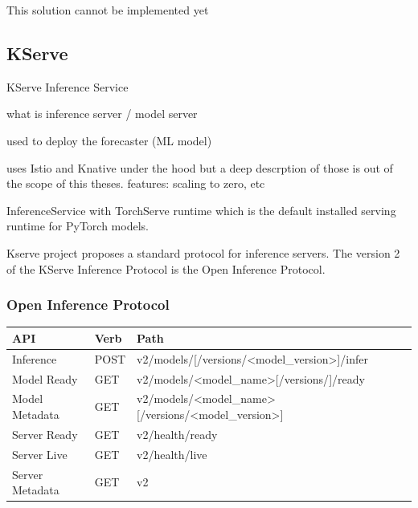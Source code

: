 This solution cannot be implemented yet




\subsection{KServe}


KServe Inference Service


what is
inference server / model server


used to deploy the forecaster (ML model)


uses Istio and Knative under the hood
but a deep descrption of those is out of the scope of this theses.
features: scaling to zero, etc


InferenceService with TorchServe runtime which is the default installed serving runtime for PyTorch models.

Kserve project proposes a standard protocol for inference servers.
The version 2 of the KServe Inference Protocol is the Open Inference Protocol.



\subsubsection{Open Inference Protocol}


\begin{table}[h!]
\centering
\begin{tabular}{|l|l|l|}
\hline
\textbf{API}    & \textbf{Verb} & \textbf{Path}                                                                                         \\ \hline
Inference       & POST          & v2/models/{[}/versions/\textless{}model\_version\textgreater{}{]}/infer                               \\ \hline
Model Ready     & GET           & v2/models/\textless{}model\_name\textgreater{}{[}/versions/{]}/ready                                  \\ \hline
Model Metadata  & GET           & v2/models/\textless{}model\_name\textgreater{}{[}/versions/\textless{}model\_version\textgreater{}{]} \\ \hline
Server Ready    & GET           & v2/health/ready                                                                                       \\ \hline
Server Live     & GET           & v2/health/live                                                                                        \\ \hline
Server Metadata & GET           & v2                                                                                                    \\ \hline
\end{tabular}
\end{table}





